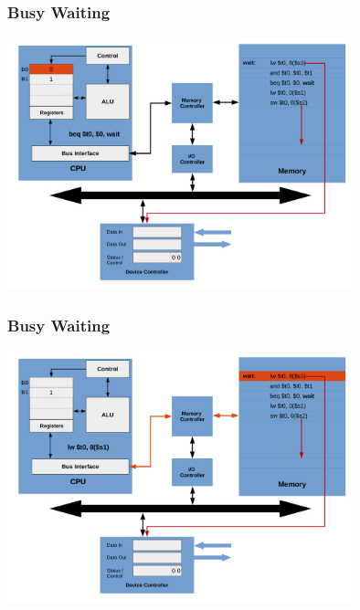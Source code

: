 \documentclass{beamer}
\begin{document}
\begin{frame}%
\frametitle{Busy Waiting}

\vspace*{-0.2cm}
\begin{center}
\hspace*{-1cm}\includegraphics[width=10cm]{busy_waiting8bis.pdf}
\end{center}

\end{frame}

\begin{frame}%
\frametitle{Busy Waiting}

\vspace*{-0.2cm}
\begin{center}
\hspace*{-1cm}\includegraphics[width=10cm]{busy_waiting3.pdf}
\end{center}

\end{frame}
\end{document}
